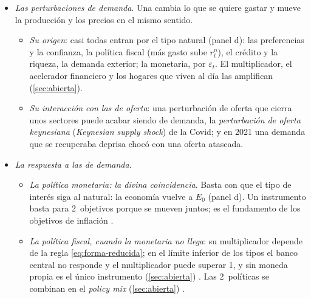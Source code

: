 \documentclass[11pt]{article}
\begin{document}
\begin{itemize}
\begin{itemize}
  \item \emph{Las } aumentan la capacidad productiva o reducen los costes: competencia en los mercados de bienes y reformas del de trabajo , productividad  y diversificación energética . Bajan la NKPC y mejoran a la vez la brecha y la inflación, sin dilema (panel c). Las políticas de rentas, que buscan bajar la cuña sin pasar por el paro, y la agenda europea actual se ven con la economía abierta (\ref{sec:abierta}).
  \end{itemize}
\item \emph{Las perturbaciones de demanda}. Una  cambia lo que se quiere gastar y mueve la producción y los precios en el mismo sentido.
  \begin{itemize}
  \item \emph{Su origen}: casi todas entran por el tipo natural (panel d): las preferencias y la confianza, la política fiscal (más gasto sube $r^n_t$), el crédito y la riqueza, la demanda exterior; la monetaria, por $\varepsilon_t$. El multiplicador, el acelerador financiero y los hogares que viven al día las amplifican (\ref{sec:abierta}).
  \item \emph{Su interacción con las de oferta}: una perturbación de oferta que cierra unos sectores puede acabar siendo de demanda, la \emph{perturbación de oferta keynesiana} (\emph{Keynesian supply shock}) de la Covid\nocite{GuerrieriEtAl2022}; y en 2021 una demanda que se recuperaba deprisa chocó con una oferta atascada\nocite{BernankeBlanchard2025What}.
  \end{itemize}
\item \emph{La respuesta a las de demanda}.
  \begin{itemize}
  \item \emph{La política monetaria: la divina coincidencia}. Basta con que el tipo de interés siga al natural: la economía vuelve a $E_0$ (panel d). Un instrumento basta para 2~objetivos porque se mueven juntos; es el fundamento de los objetivos de inflación .
  \item \emph{La política fiscal, cuando la monetaria no llega}: su multiplicador depende de la regla \eqref{eq:forma-reducida}; en el límite inferior de los tipos el banco central no responde y el multiplicador puede superar 1\nocite{ChristianoEichenbaumRebelo2011}, y sin moneda propia es el único instrumento (\ref{sec:abierta}) . Las 2~políticas se combinan en el \emph{policy mix} (\ref{sec:abierta}) .
  \end{itemize}
\end{itemize}
\end{document}

